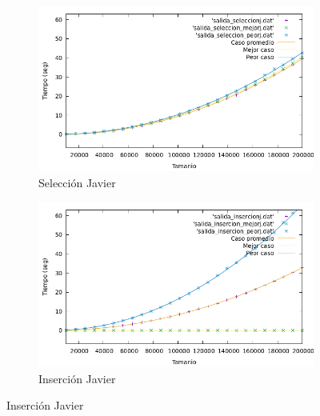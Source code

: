 \documentclass[10pt,a4paper]{article}
\begin{document}
\begin{figure}[h!]
	\begin{subfigure}{.5\textwidth}
		\centering
		\includegraphics[scale=0.3]{../../Images/Grafica_casos_seleccion_Javi5454.png}
		\caption{Selección Javier}
	\end{subfigure}
	\hfill
	\begin{subfigure}{.5\textwidth}
		\centering
		\includegraphics[scale=0.3]{../../Images/Grafica_insercion_casos_Javi5454.png}
		\caption{Inserción Javier}
	\end{subfigure}
\end{figure}
\end{document}
